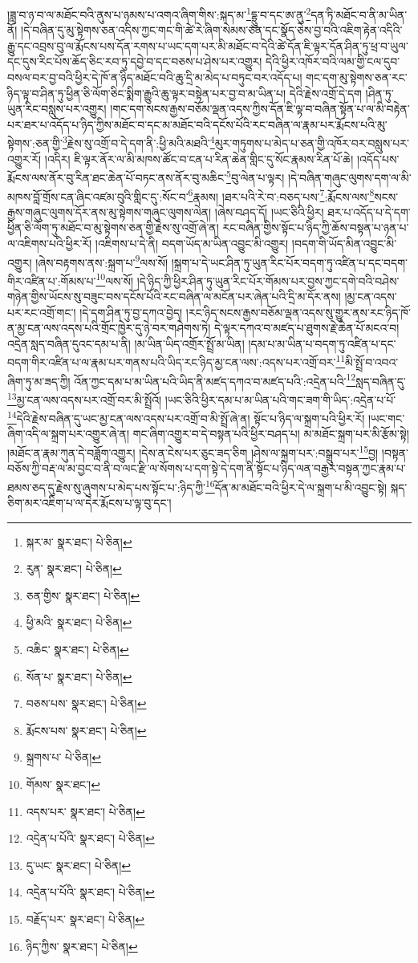།ཟླ་བ་ཉ་བ་ལ་མཐོང་བའི་ནུས་པ་ཉམས་པ་འགའ་ཞིག་གིས་:སྐད་མ་\footnote{སྐར་མ་  སྣར་ཐང་།  པེ་ཅིན། }དྷྲུུ་བ་དང་ཨ་ནུ་\footnote{རུན་  སྣར་ཐང་།  པེ་ཅིན། }དན་ཏི་མཐོང་བ་ནི་མ་ཡིན་ནོ། །དེ་བཞིན་དུ་མུ་སྟེགས་ཅན་འདིས་ཀྱང་གང་གི་ཚེ་རེ་ཞིག་སེམས་ཅན་དང་སྣོད་ཅེས་བྱ་བའི་འཇིག་རྟེན་འདིའི་རྒྱུ་དང་འབྲས་བུ་ལ་རྨོངས་པས་དོན་རགས་པ་ཡང་དག་པར་མི་མཐོང་བ་དེའི་ཚེ་དོན་ཇི་ལྟར་དོན་ཤིན་ཏུ་ཕྲ་བ་ཡུལ་དང་དུས་རིང་པོས་ཆོད་ཅིང་རབ་ཏུ་དབྱེ་བ་དང་བཅས་པ་ཤེས་པར་འགྱུར། དེའི་ཕྱིར་འཁོར་བའི་ལམ་གྱི་ངལ་དུབ་བསལ་བར་བྱ་བའི་ཕྱིར་དེ་ཁོ་ན་ཉིད་མཐོང་བའི་ཆུ་དྲི་མ་མེད་པ་བཏུང་བར་འདོད་པ། གང་དག་མུ་སྟེགས་ཅན་རང་ཉིད་ལྟ་བ་ཤིན་ཏུ་ཕྱིན་ཅི་ལོག་ཅིང་སྨིག་རྒྱུའི་ཆུ་ལྟར་བསྟེན་པར་བྱ་བ་མ་ཡིན་པ། དེའི་རྗེས་འགྲོ་དེ་དག །ཤིན་ཏུ་ཡུན་རིང་བསླུས་པར་འགྱུར། །གང་དག་སངས་རྒྱས་བཅོམ་ལྡན་འདས་ཀྱིས་དོན་ཇི་ལྟ་བ་བཞིན་སྟོན་པ་ལ་མི་བརྟེན་པར་ཐར་པ་འདོད་པ་ཉིད་ཀྱིས་མཐོང་བ་དང་མ་མཐོང་བའི་དངོས་པོའི་རང་བཞིན་ལ་རྣམ་པར་རྨོངས་པའི་མུ་སྟེགས་:ཅན་གྱི་\footnote{ཅན་གྱིས་  སྣར་ཐང་།  པེ་ཅིན། }རྗེས་སུ་འགྲོ་བ་དེ་དག་ནི་:ཕྱི་མའི་མཐའི་\footnote{ཕྱི་མའི་  སྣར་ཐང་།  པེ་ཅིན། }མུར་གཏུགས་པ་མེད་པ་ཅན་གྱི་འཁོར་བར་བསླུས་པར་འགྱུར་རོ། །འདིར། ཇི་ལྟར་ནོར་ལ་མི་མཁས་ཚོང་བ་ངན་པ་རིན་ཆེན་གླིང་དུ་སོང་རྣམས་རིན་པོ་ཆེ། །འདོད་པས་རྨོངས་ལས་ནོར་བུ་རིན་ཐང་ཆེན་པོ་བཏང་ནས་ནོར་བུ་མཆིང་\footnote{འཆིང་  སྣར་ཐང་།  པེ་ཅིན། }བུ་ལེན་པ་ལྟར། །དེ་བཞིན་གཞུང་ལུགས་དག་ལ་མི་མཁས་བློ་གྲོས་ངན་ཞིང་འཛམ་བུའི་གླིང་དུ་:སོང་བ་\footnote{སོན་པ་  སྣར་ཐང་།  པེ་ཅིན། }རྣམས། །ཐར་པའི་རེ་བ་:བཅད་པས་\footnote{བཅས་པས་  སྣར་ཐང་།  པེ་ཅིན། }:རྨོངས་ལས་\footnote{རྨོངས་པས་  སྣར་ཐང་།  པེ་ཅིན། }སངས་རྒྱས་གཞུང་ལུགས་དོར་ནས་མུ་སྟེགས་གཞུང་ལུགས་ལེན། །ཞེས་བཤད་དོ། །ཡང་ཅིའི་ཕྱིར། ཐར་པ་འདོད་པ་དེ་དག་ཕྱིན་ཅི་ལོག་ཏུ་མཐོང་བ་མུ་སྟེགས་ཅན་གྱི་རྗེས་སུ་འགྲོ་ཞེ་ན། རང་བཞིན་གྱིས་སྟོང་པ་ཉིད་ཀྱི་ཆོས་བསྟན་པ་ཉན་པ་ལ་འཇིགས་པའི་ཕྱིར་རོ། །འཇིགས་པ་དེ་ནི། བདག་ཡོད་མ་ཡིན་འབྱུང་མི་འགྱུར། །བདག་གི་ཡོད་མིན་འབྱུང་མི་འགྱུར། །ཞེས་བརྟགས་ནས་:སྐྲག་པ་\footnote{སྐྲགས་པ་  པེ་ཅིན། }ལས་སོ། །སྐྲག་པ་དེ་ཡང་ཤིན་ཏུ་ཡུན་རིང་པོར་བདག་ཏུ་འཛིན་པ་དང་བདག་གིར་འཛིན་པ་:གོམས་པ་\footnote{གོམས་  སྣར་ཐང་། }ལས་སོ། །དེ་ཉིད་ཀྱི་ཕྱིར་ཤིན་ཏུ་ཡུན་རིང་པོར་གོམས་པར་བྱས་ཀྱང་དགེ་བའི་བཤེས་གཉེན་གྱིས་ཡོངས་སུ་བཟུང་བས་དངོས་པོའི་རང་བཞིན་ལ་མངོན་པར་ཞེན་པའི་དྲི་མ་དོར་ནས། །མྱ་ངན་འདས་པར་རང་འགྲོ་གང་། །དེ་དག་ཤིན་ཏུ་བྱ་དཀའ་བྱེད། །རང་ཉིད་སངས་རྒྱས་བཅོམ་ལྡན་འདས་སུ་གྱུར་ནས་རང་ཉིད་ཁོ་ན་མྱ་ངན་ལས་འདས་པའི་གྲོང་ཁྱེར་དུ་ཉེ་བར་གཤེགས་ཏེ། དེ་ལྟར་དཀའ་བ་མཛད་པ་ཐུགས་རྗེ་ཆེན་པོ་མངའ་བ། འདྲེན་སླད་བཞིན་དུའང་དམ་པ་ནི། །མ་ཡིན་ཡིད་འགྲོར་སྤྲོ་མ་ཡིན། །དམ་པ་མ་ཡིན་པ་བདག་ཏུ་འཛིན་པ་དང་བདག་གིར་འཛིན་པ་ལ་རྣམ་པར་གནས་པའི་ཡིད་རང་ཉིད་མྱ་ངན་ལས་:འདས་པར་འགྲོ་བར་\footnote{འདས་པར་  སྣར་ཐང་།  པེ་ཅིན། }མི་སྤྲོ་བ་འབའ་ཞིག་ཏུ་མ་ཟད་ཀྱི། འོན་ཀྱང་དམ་པ་མ་ཡིན་པའི་ཡིད་ནི་མཛད་དཀའ་བ་མཛད་པའི་:འདྲེན་པའི་\footnote{འདྲེན་པ་པོའི་  སྣར་ཐང་།  པེ་ཅིན། }སླད་བཞིན་དུ་\footnote{དུ་ཡང་  སྣར་ཐང་།  པེ་ཅིན། }མྱ་ངན་ལས་འདས་པར་འགྲོ་བར་མི་སྤྲོའོ། །ཡང་ཅིའི་ཕྱིར་དམ་པ་མ་ཡིན་པའི་གང་ཟག་གི་ཡིད་:འདྲེན་པ་པོ་\footnote{འདྲེན་པ་པོའི་  སྣར་ཐང་།  པེ་ཅིན། }དེའི་རྗེས་བཞིན་དུ་ཡང་མྱ་ངན་ལས་འདས་པར་འགྲོ་བ་མི་སྤྲོ་ཞེ་ན། སྟོང་པ་ཉིད་ལ་སྐྲག་པའི་ཕྱིར་རོ། །ཡང་གང་ཞིག་འདི་ལ་སྐྲག་པར་འགྱུར་ཞེ་ན། གང་ཞིག་འགྱུར་བ་དེ་བསྟན་པའི་ཕྱིར་བཤད་པ། མ་མཐོང་སྐྲག་པར་མི་རྩོམ་སྟེ། །མཐོང་ན་རྣམ་ཀུན་དེ་བཟློག་འགྱུར། །དེས་ན་ངེས་པར་ཅུང་ཟད་ཅིག །ཤེས་ལ་སྐྲག་པར་:བསྒྲུབ་པར་\footnote{བརྗོད་པར་  སྣར་ཐང་།  པེ་ཅིན། }བྱ། །བསྟན་བཅོས་ཀྱི་བརྡ་ལ་མ་བྱང་བ་ནི་བ་ལང་རྫི་ལ་སོགས་པ་དག་སྟེ་དེ་དག་ནི་སྟོང་པ་ཉིད་ལན་བརྒྱར་བསྟན་ཀྱང་རྣམ་པ་ཐམས་ཅད་དུ་རྗེས་སུ་ཞུགས་པ་མེད་པས་སྟོང་པ་:ཉིད་ཀྱི་\footnote{ཉིད་ཀྱིས་  སྣར་ཐང་།  པེ་ཅིན། }དོན་མ་མཐོང་བའི་ཕྱིར་དེ་ལ་སྐྲག་པ་མི་འབྱུང་སྟེ། སྐད་ཅིག་མར་འཇིག་པ་ལ་དེར་རྨོངས་པ་ལྟ་བུ་དང་། 